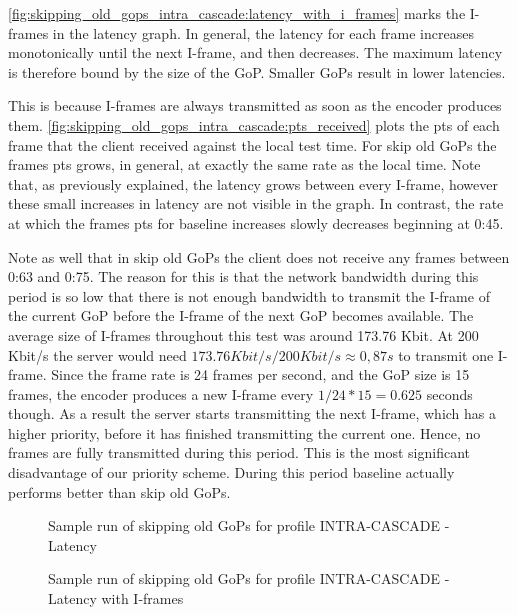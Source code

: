 \autoref{fig:skipping_old_gops_intra_cascade:latency_with_i_frames} marks the I-frames in the latency graph. In general,
the latency for each frame increases monotonically until the next I-frame, and then decreases. The maximum latency is therefore bound by the size of the GoP. Smaller GoPs result in lower latencies.

This is because I-frames are always transmitted as soon as the encoder produces them. \autoref{fig:skipping_old_gops_intra_cascade:pts_received} plots the pts of each frame that the client received against the local test time. For skip old GoPs the frames pts grows, in general, at exactly the same rate as the local time. Note that, as previously explained, the latency grows between every I-frame, however these small increases in latency are not visible in the graph. %
In contrast, the rate at which the frames pts for baseline increases slowly decreases beginning at 0:45.

Note as well that in skip old GoPs the client does not receive any frames between 0:63 and 0:75. The reason for this
is that the network bandwidth during this period is so low that there is not enough bandwidth to transmit the I-frame
of the current GoP before the I-frame of the next GoP becomes available. The average size of I-frames throughout this
test was around 173.76 Kbit. At 200 Kbit/s the server would need $173.76 Kbit/s / 200 Kbit/s \approx 0,87 s$ to transmit one I-frame. Since the frame rate is 24 frames per second, and the GoP size is 15 frames, the encoder produces a new I-frame every $1/24 * 15 = 0.625$ seconds though. As a result the server starts transmitting
the next I-frame, which has a higher priority, before it has finished transmitting the current one. Hence, no frames are fully transmitted during this period. This is the most significant disadvantage of our priority scheme. During this period baseline actually performs better than skip old GoPs.

\begin{figure}
    \centering
    
    \caption{Sample run of skipping old GoPs for profile INTRA-CASCADE - Latency}
    \label{fig:skipping_old_gops_intra_cascade:latency}
\end{figure}

\begin{figure}
    \centering
    
    \caption{Sample run of skipping old GoPs for profile INTRA-CASCADE - Latency with I-frames}
    \label{fig:skipping_old_gops_intra_cascade:latency_with_i_frames}
\end{figure}

